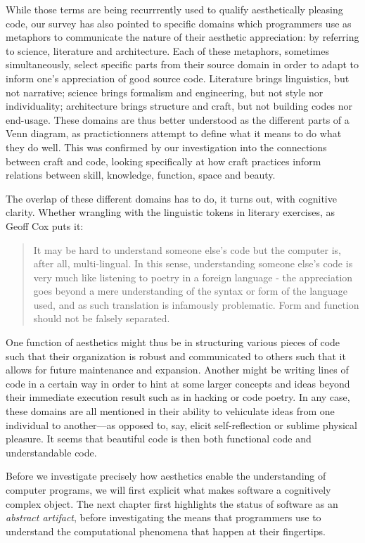 While those terms are being recurrrently used to qualify aesthetically pleasing code, our survey has also pointed to specific domains which programmers use as metaphors to communicate the nature of their aesthetic appreciation: by referring to science, literature and architecture. Each of these metaphors, sometimes simultaneously, select specific parts from their source domain in order to adapt to inform one's appreciation of good source code. Literature brings linguistics, but not narrative; science brings formalism and engineering, but not style nor individuality; architecture brings structure and craft, but not building codes nor end-usage. These domains are thus better understood as the different parts of a Venn diagram, as practictionners attempt to define what it means to do what they do well. This was confirmed by our investigation into the connections between craft and code, looking specifically at how craft practices inform relations between skill, knowledge, function, space and beauty.

The overlap of these different domains has to do, it turns out, with cognitive clarity. Whether wrangling with the linguistic tokens in literary exercises, as Geoff Cox puts it:

\begin{quote}
  It may be hard to understand someone else's code but the computer is, after all, multi-lingual. In this sense, understanding someone else's code is very much like listening to poetry in a foreign language - the appreciation goes beyond a mere understanding of the syntax or form of the language used, and as such translation is infamously problematic. Form and function should not be falsely separated. \citep{cox_aesthetics_2011}
\end{quote}

One function of aesthetics might thus be in structuring various pieces of code such that their organization is robust and communicated to others such that it allows for future maintenance and expansion. Another might be writing lines of code in a certain way in order to hint at some larger concepts and ideas beyond their immediate execution result such as in hacking or code poetry. In any case, these domains are all mentioned in their ability to vehiculate ideas from one individual to another—as opposed to, say, elicit self-reflection or sublime physical pleasure. It seems that beautiful code is then both functional code and understandable code.

Before we investigate precisely how aesthetics enable the understanding of computer programs, we will first explicit what makes software a cognitively complex object. The next chapter first highlights the status of software as an \emph{abstract artifact}, before investigating the means that programmers use to understand the computational phenomena that happen at their fingertips.

